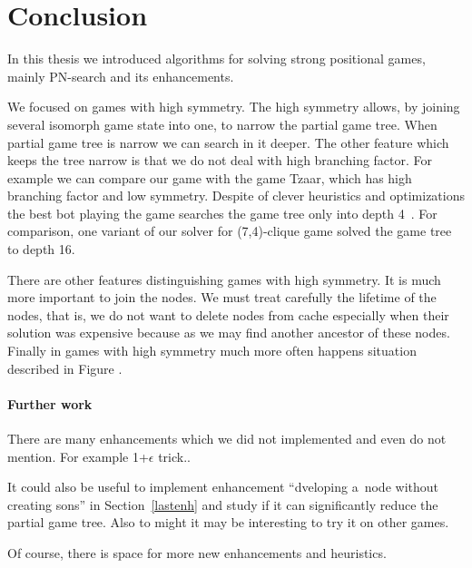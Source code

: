 \chapter*{Conclusion}

In this thesis we introduced algorithms for solving strong positional games,
mainly PN-search and its enhancements.

We focused on games with high symmetry. The high symmetry allows, by joining
several isomorph game state into one, to narrow the partial game tree. When
partial game tree is narrow we can search in it deeper. The other feature which
keeps the tree narrow is that we do not deal with high branching factor. For
example we can compare our game with the game Tzaar, which has high branching
factor and low symmetry. Despite of clever heuristics and optimizations the
best bot playing the game searches the game tree only into depth
4~\cite{paulie}. For comparison, one variant of our solver for (7,4)-clique
game solved the game tree to depth 16.

There are other features distinguishing games with high symmetry. It is much
more important to join the nodes. We must treat carefully the lifetime of
the nodes, that is, we do not want to delete nodes from cache especially when their
solution was expensive because as we may find another ancestor of these nodes.
Finally in games with high symmetry much more often happens situation described
in Figure .

\subsubsection{Further work}

There are many enhancements which we did not implemented and even do
not mention. For example 1+$\epsilon$ trick..

It could also be useful to implement enhancement ``dveloping a~node without creating sons''
in Section~\ref{lastenh} and study if it can significantly reduce the partial game
tree. Also to might it may be interesting to try it on other games.

Of course, there is space for more new enhancements and heuristics. 


